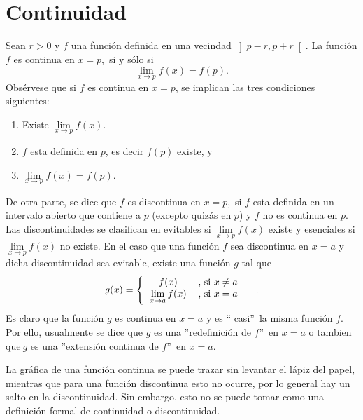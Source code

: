 \section{Continuidad}

Sean $r>0$ y $f$ una funci\'{o}n definida en una vecindad $\left]
p-r,p+r\right[  $. La funci\'{o}n $f$ es continua en $x=p,$ si y s\'{o}lo si
\[
\lim\limits_{x\rightarrow p}f(x)=f(p).
\]
Obs\'{e}rvese que si $f$ es continua%
en $x=p$, se implican las tres condiciones siguientes:

\begin{enumerate}
\item Existe $\lim\limits_{x\rightarrow p}f(x).$

\item $f$ esta definida en $p$, es decir $f(p)$ existe, y

\item $\lim\limits_{x\rightarrow p}f(x)=f(p).$
\end{enumerate}

De otra parte, se dice que $f$ es discontinua en $x=p,$ si $f$ esta definida
en un intervalo abierto que contiene a $p$ (excepto quiz\'{a}s en $p$) y $f$
no es continua en $p.$ Las discontinuidades%
%
se clasifican en evitables si $\lim\limits_{x\rightarrow p}f(x)$ existe y
esenciales si $\lim\limits_{x\rightarrow p}f(x)$ no existe. En el caso que una
funci\'{o}n $f$ sea discontinua en $x=a$ y dicha discontinuidad sea evitable,
existe una funci\'{o}n $g$ tal que
\[
g(x)=\left\{
\begin{tabular}
[c]{cc}%
$f(x)$ & , si $x\neq a$\\
$\lim\limits_{x\rightarrow a}f(x)$ & , si $x=a$%
\end{tabular}
\ \ \ \right.  .
\]
Es claro que la funci\'{o}n $g$ es continua en $x=a$ y es \textquotedblleft
casi\textquotedblright\ la misma funci\'{o}n $f$. Por ello, usualmente se dice
que $g$ es una
%
\textquotedblright redefinici\'{o}n de $f$\textquotedblright\ en $x=a$ o
tambien que$\ g$ es una \textquotedblright extensi\'{o}n continua de
$f$\textquotedblright\ en $x=a$.

\begin{remark}
La gr\'{a}fica de una funci\'{o}n continua se puede trazar sin levantar el
l\'{a}piz del papel, mientras que para una funci\'{o}n discontinua esto no
ocurre, por lo general hay un salto en la discontinuidad. Sin embargo, esto no
se puede tomar como una definici\'{o}n formal de continuidad o discontinuidad.
\end{remark}

